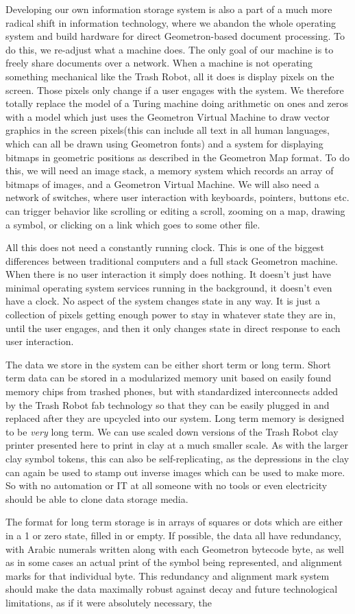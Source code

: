 Developing our own information storage system is also a part of a much more radical shift in information technology, where we abandon the whole operating system and build hardware for direct Geometron-based document processing.  To do this, we re-adjust what a machine does.  The only goal of our machine is to freely share documents over a network.  When a machine is not operating something mechanical like the Trash Robot, all it does is display pixels on the screen. Those pixels only change if a user engages with the system. We therefore totally replace the model of a Turing machine doing arithmetic on ones and zeros with a model which just uses the Geometron Virtual Machine to draw vector graphics in the screen pixels(this can include all text in all human languages, which can all be drawn using Geometron fonts) and a system for displaying bitmaps in geometric positions as described in the Geometron Map format.  To do this, we will need an image stack, a memory system which records an array of bitmaps of images, and a Geometron Virtual Machine.  We will also need a network of switches, where user interaction with keyboards, pointers, buttons etc. can trigger behavior like scrolling or editing a scroll, zooming on a map, drawing a symbol, or clicking on a link which goes to some other file.  

All this does not need a constantly running clock. This is one of the biggest differences between traditional computers and a full stack Geometron machine.  When there is no user interaction it simply does nothing. It doesn't just have minimal operating system services running in the background, it doesn't even have a clock. No aspect of the system changes state in any way. It is just a collection of pixels getting enough power to stay in whatever state they are in, until the user engages, and then it only changes state in direct response to each user interaction.

The data we store in the system can be either short term or long term.  Short term data can be stored in a modularized memory unit based on easily found memory chips from trashed phones, but with standardized interconnects added by the Trash Robot fab technology so that they can be easily plugged in and replaced after they are upcycled into our system.  Long term memory is designed to be \emph{very} long term.  We can use scaled down versions of the Trash Robot clay printer presented here to print in clay at a much smaller scale.  As with the larger clay symbol tokens, this can also be self-replicating, as the depressions in the clay can again be used to stamp out inverse images which can be used to make more.  So with no automation or IT at all someone with no tools or even electricity should be able to clone data storage media. 

The format for long term storage is in arrays of squares or dots which are either in a 1 or zero state, filled in or empty.  If possible, the data all have redundancy, with Arabic numerals written along with each Geometron bytecode byte, as well as in some cases an actual print of the symbol being represented, and alignment marks for that individual byte.  This redundancy and alignment mark system should make the data maximally robust against decay and future technological limitations, as if it were absolutely necessary, the 